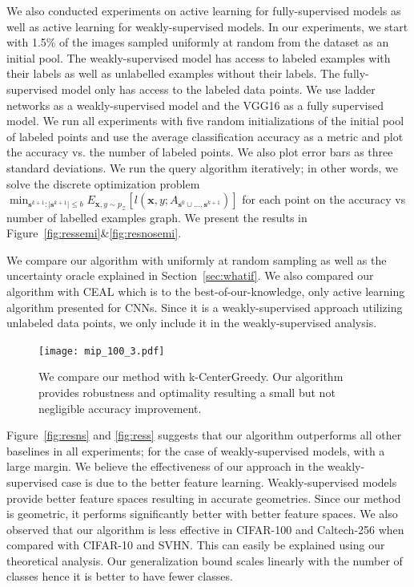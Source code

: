 \documentclass{article}
\begin{document}
We also conducted experiments on active learning for fully-supervised models as well as active learning for weakly-supervised models. In our experiments, we start with 1.5\% of the images sampled uniformly at random from the dataset as an initial pool. The weakly-supervised model has access to labeled examples with their labels as well as unlabelled examples without their labels. The fully-supervised model only has access to the labeled data points. We use ladder networks\cite{ladder} as a weakly-supervised model and the VGG16\cite{vgg} as a fully supervised model. We run all experiments with five random initializations of the initial pool of labeled points and use the average classification accuracy as a metric and plot the accuracy vs. the number of labeled points. We also plot error bars as three standard deviations. We run the query algorithm iteratively; in other words, we solve the discrete optimization problem $\min_{\mathbf{s}^{k+1} : |\mathbf{s}^{k+1}| \leq b} E_{\mathbf{x},y \sim p_\mathcal{Z}} [l(\mathbf{x},y; A_{\mathbf{s}^{0} \cup \ldots, \mathbf{s}^{k+1}})]$ for each point on the accuracy vs number of labelled examples graph. We present the results in Figure~\ref{fig:ressemi}\&\ref{fig:resnosemi}.


We compare our algorithm with uniformly at random sampling as well as the uncertainty oracle explained in Section~\ref{sec:whatif}. We also compared our algorithm with CEAL \cite{wang2016cost} which is to the best-of-our-knowledge, only active learning algorithm presented for CNNs. Since it is a weakly-supervised approach utilizing unlabeled data points, we only include it in the weakly-supervised analysis.

 \begin{figure}
\texttt{[image: mip\_100\_3.pdf]}
\caption{We compare our method with k-CenterGreedy. Our algorithm provides robustness and optimality resulting a small but not negligible accuracy improvement. }
\label{fig:twoopt}
\vspace{-5mm}
\end{figure}

Figure~\ref{fig:resns} and \ref{fig:ress} suggests that our algorithm outperforms all other baselines in all experiments; for the case of weakly-supervised models, with a large margin. We believe the effectiveness of our approach in the weakly-supervised case is due to the better feature learning. Weakly-supervised models provide better feature spaces resulting in accurate geometries. Since our method is geometric, it performs significantly better with better feature spaces. We also observed that our algorithm is less effective in CIFAR-100 and Caltech-256 when compared with CIFAR-10 and SVHN. This can easily be explained using our theoretical analysis. Our generalization bound scales linearly with the number of classes hence it is better to have fewer classes.
\end{document}
